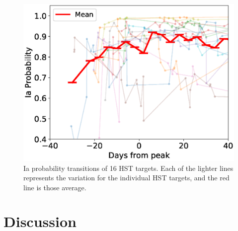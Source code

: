\documentclass[useamsfonts]{pasj01}
\begin{document}
%
%
\begin{figure}[htbp]
  \begin{center}
     \includegraphics[width=\columnwidth]{figures/HST_DaysFromPeak_vs_IaProbability_200108.eps}
  \end{center}
  \caption{%
  Ia probability transitions of 16 HST targets. Each of the lighter lines represents the variation for the individual HST targets, and the red line is those average.
  }%
  \label{fig:HSTIaprob}
\end{figure}
%
%
\section{Discussion}
%
\end{document}
